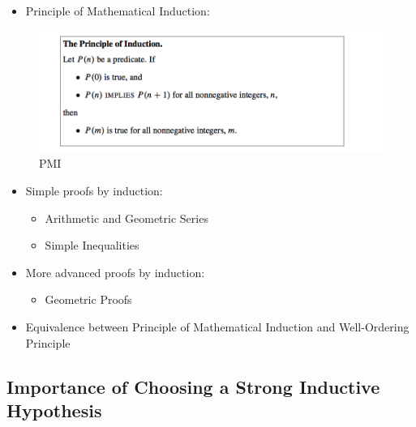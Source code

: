 \documentclass[11pt]{article}
\makeatletter
\def\maxwidth{\ifdim\Gin@nat@width>\linewidth\linewidth
     \else\Gin@nat@width\fi}
\let\Oldincludegraphics\includegraphics
\renewcommand{\includegraphics}[1]{\Oldincludegraphics[width=.8\maxwidth]{#1}}
\providecommand{\tightlist}{%
       \setlength{\itemsep}{0pt}\setlength{\parskip}{0pt}}
\makeatother
\begin{document}
 \begin{itemize}
 \tightlist
 \item
   Principle of Mathematical Induction:
 \end{itemize}
 
 \begin{figure}
 \centering
 \includegraphics{images/L13/pmi.png}
 \caption{PMI}
 \end{figure}
 
     \begin{itemize}
 \tightlist
 \item
   Simple proofs by induction:
 
   \begin{itemize}
   \tightlist
   \item
     Arithmetic and Geometric Series
   \item
     Simple Inequalities
   \end{itemize}
 \end{itemize}
 
     \begin{itemize}
 \tightlist
 \item
   More advanced proofs by induction:
 
   \begin{itemize}
   \tightlist
   \item
     Geometric Proofs
   \end{itemize}
 \end{itemize}
 
     \begin{itemize}
 \tightlist
 \item
   Equivalence between Principle of Mathematical Induction and
   Well-Ordering Principle
 \end{itemize}
 
     \subsection{Importance of Choosing a Strong Inductive
 Hypothesis}\label{importance-of-choosing-a-strong-inductive-hypothesis}
 
\end{document}
